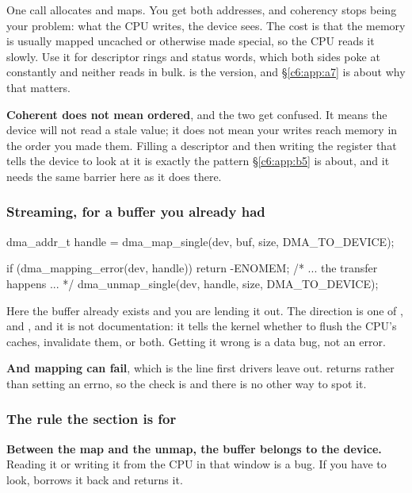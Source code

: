 \noindent One call allocates and maps. You get both addresses, and coherency stops being your
problem: what the CPU writes, the device sees. The cost is that the memory is usually mapped
uncached or otherwise made special, so the CPU reads it slowly. Use it for descriptor rings and
status words, which both sides poke at constantly and neither reads in bulk.
 is the  version, and \S\ref{c6:app:a7} is about why that
matters.

\textbf{Coherent does not mean ordered}, and the two get confused. It means the device will not read
a stale value; it does not mean your writes reach memory in the order you made them. Filling a
descriptor and then writing the register that tells the device to look at it is exactly the pattern
\S\ref{c6:app:b5} is about, and it needs the same barrier here as it does there.

\subsubsection{Streaming, for a buffer you already had}
\label{c6:app:a:streaming-for-a-buffer-you-already-had}

\begin{ccode}
dma_addr_t handle = dma_map_single(dev, buf, size, DMA_TO_DEVICE);

if (dma_mapping_error(dev, handle))
        return -ENOMEM;
/* ... the transfer happens ... */
dma_unmap_single(dev, handle, size, DMA_TO_DEVICE);
\end{ccode}

\noindent Here the buffer already exists and you are lending it out. The direction is one of
,  and , and it is not
documentation: it tells the kernel whether to flush the CPU's caches, invalidate them, or both.
Getting it wrong is a data bug, not an error.

\textbf{And mapping can fail}, which is the line first drivers leave out. 
returns  rather than setting an errno, so the check is
 and there is no other way to spot it.

\subsubsection{The rule the section is for}
\label{c6:app:a:the-rule-the-section-is-for}

\textbf{Between the map and the unmap, the buffer belongs to the device.} Reading it or writing it
from the CPU in that window is a bug. If you have to look,  borrows it
back and  returns it.

